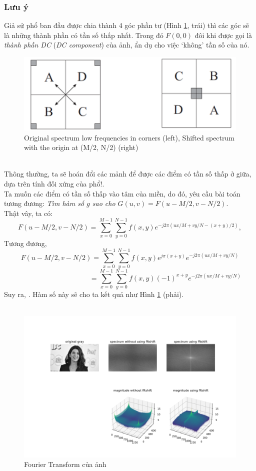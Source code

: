 \documentclass{article}
\begin{document}
        \subsubsection*{Lưu ý}
        Giả sử phổ ban đầu được chia thành 4 góc phần tư (Hình \ref{fig5}, trái) thì các góc sẽ là những thành phần có tần số thấp nhất. Trong đó $F(0,0)$ đôi khi được gọi là \textit{thành phần DC} (\textit{DC component}) của ảnh, ẩn dụ cho việc `không' tần số của nó.
        \begin{figure}[ht!]
        \centering
        \includegraphics[width = 0.5\linewidth]{fo3.png}
        \caption{Original spectrum low frequencies in corners (left), Shifted spectrum with the origin at (M/2, N/2) (right)}
        \label{fig5}
        \end{figure}
        \\ Thông thường, ta sẽ hoán đổi các mảnh để được các điểm có tần số thấp ở giữa, dựa trên tính đối xứng của phổ!.\\
        Ta muốn các điểm có tần số thấp vào tâm của miền, do đó, yêu cầu bài toán tương đương: \textit{Tìm hàm số $g$ sao cho $G(u,v) = F(u-M/2,v-N/2)$}.\\
        Thật vây, ta có:
        $$F(u-M/2, v-N/2) = \sum_{x=0}^{M-1} \sum_{y=0}^{N-1} f(x,y) e^{-j2\pi (ux/M+vy/N-(x+y)/2)},$$
        Tương đương,
        $$F(u-M/2, v-N/2) = \sum_{x=0}^{M-1} \sum_{y=0}^{N-1} f(x,y) e^{j\pi(x+y)} e^{-j2\pi (ux/M+vy/N)} 
        $$
        $$\phantom{F(u-M/2, v-N/2)} = \sum_{x=0}^{M-1} \sum_{y=0}^{N-1} f(x,y) (-1)^{x+y} e^{-j2\pi (ux/M+vy/N)}$$
        Suy ra, . Hàm số này sẽ cho ta kết quả như Hình \ref{fig5} (phải).\\ \\
        \begin{figure}[ht!]
        \centering
        \includegraphics[width = 0.9\linewidth]{fo5.png}
        \caption{Fourier Transform của ảnh}
        \label{fig7}
        \end{figure}
\end{document}
